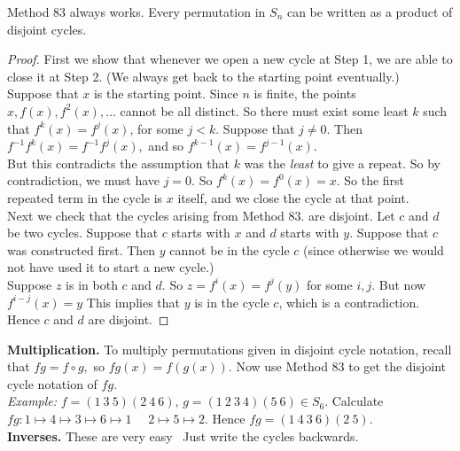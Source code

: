 \documentclass[twoside]{scrartcl}
\begin{document}
\begin{proposition} Method 83 always works. Every permutation in $S_n$ can be written as a product of disjoint cycles.	
\end{proposition}


\begin{proof}
	First we show that whenever we open a new cycle at Step 1, we are able to close it at Step 2. (We always get back to the starting point eventually.)\\
	
	Suppose that $x$ is the starting point. Since $n$ is finite, the points $x, f(x), f^2(x),\dots$ cannot be all distinct. So there must exist some least $k$ such that $f^k(x) = f^j(x)$, for some $j < k$. Suppose that $j \neq 0$. Then $f^{-1}f^k(x) = f^{-1}f^j(x),$ and so $f^{k-1}(x) = f^{j-1}(x)$.\\
	
	 But this contradicts the assumption that $k$ was the \emph{least} to give a repeat. So by contradiction, we must have $j = 0$. So $f^k(x) = f^0(x) = x$. So the first repeated term in the cycle is $x$ itself, and we close the cycle at that point.\\
	 
	 Next we check that the cycles arising from Method 83. are disjoint. Let $c$ and $d$ be two cycles. Suppose that $c$ starts with $x$ and $d$ starts with $y$. Suppose that $c$ was constructed first. Then $y$ cannot be in the cycle $c$ (since otherwise we would not have used it to start a new cycle.)\\
	 
	 Suppose $z$ is in both $c$ and $d$. So $z = f^i(x) = f^j(y)$ for some $i,j$. But now $f^{i-j}(x) = y$ This implies that $y$ is in the cycle $c$, which is a contradiction. Hence $c$ and $d$ are disjoint.
\end{proof}\vspace*{10pt}


\noindent \textbf{Multiplication.} To multiply permutations given in disjoint cycle notation, recall that $fg = f \circ g,$ so $fg(x) = f(g(x))$. Now use Method 83 to get the disjoint cycle notation of $fg$. \\

\textit{Example:} $f = (1~3~5)(2~4~6)$, $g = (1~2~3~4)(5~6) \in S_6$. Calculate $fg: 1 \mapsto 4 \mapsto 3 \mapsto 6 \mapsto 1\quad $ $2\mapsto 5 \mapsto 2$. Hence $fg = (1~4~3~6)(2~5)$.\\
 
 
 \noindent \textbf{Inverses.} These are very easy~ Just write the cycles backwards.\\ 
 
\end{document}
